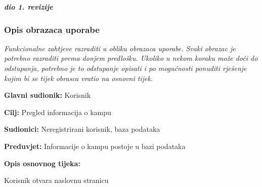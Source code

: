 				\textbf{\textit{dio 1. revizije}}
				
				\subsubsection{Opis obrazaca uporabe}
					\textit{Funkcionalne zahtjeve razraditi u obliku obrazaca uporabe. Svaki obrazac je potrebno razraditi prema donjem predlošku. Ukoliko u nekom koraku može doći do odstupanja, potrebno je to odstupanje opisati i po mogućnosti ponuditi rješenje kojim bi se tijek obrasca vratio na osnovni tijek.}\\
					
					
					\noindent {}
					\begin{packed_item}
						
						\item \textbf{Glavni sudionik: } Korisnik
						\item  \textbf{Cilj:} Pregled informacija o kampu
						\item  \textbf{Sudionici:} Neregistrirani korisnik, baza podataka
						\item  \textbf{Preduvjet:} Informacije o kampu postoje u bazi podataka
						\item  \textbf{Opis osnovnog tijeka:}
						
						\item[] \begin{packed_enum}
							
							\item Korisnik otvara naslovnu stranicu
							
						\end{packed_enum}
						
						
					\end{packed_item}
					
